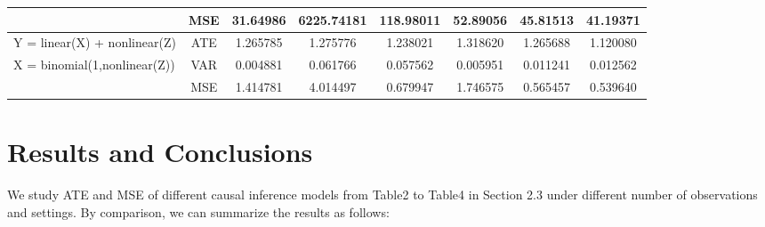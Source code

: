 \documentclass{elegantpaper}
\begin{document}
\begin{table}[H]
\begin{tabular}{llllllll}
                     & \multicolumn{1}{c}{MSE} & \multicolumn{1}{c}{31.64986} & \multicolumn{1}{c}{6225.74181} & \multicolumn{1}{c}{118.98011} & \multicolumn{1}{c}{52.89056}& \multicolumn{1}{c}{45.81513} & \multicolumn{1}{c}{41.19371 }\\%
    \midrule
    Y = linear(X) + nonlinear(Z) & \multicolumn{1}{c}{ATE} & \multicolumn{1}{c}{1.265785} & \multicolumn{1}{c}{1.275776} & \multicolumn{1}{c}{1.238021} & \multicolumn{1}{c}{1.318620}& \multicolumn{1}{c}{1.265688} & \multicolumn{1}{c}{1.120080}\\
    X = binomial(1,nonlinear(Z)) & \multicolumn{1}{c}{VAR} & \multicolumn{1}{c}{0.004881} & \multicolumn{1}{c}{0.061766} & \multicolumn{1}{c}{ 0.057562} & \multicolumn{1}{c}{0.005951}& \multicolumn{1}{c}{0.011241} & \multicolumn{1}{c}{0.012562}\\
                     & \multicolumn{1}{c}{MSE} & \multicolumn{1}{c}{ 1.414781} & \multicolumn{1}{c}{4.014497} & \multicolumn{1}{c}{0.679947} & \multicolumn{1}{c}{1.746575}& \multicolumn{1}{c}{0.565457} & \multicolumn{1}{c}{0.539640}\\%
    \midrule
    \end{tabular}%
  \label{tab:reg}%
\end{table}%



\section{Results and Conclusions}
We study ATE and MSE of different causal inference models from Table2 to Table4 in Section 2.3 under different number of observations and settings. By comparison, we can summarize the results as follows:
\smallskip
\smallskip
\end{document}
